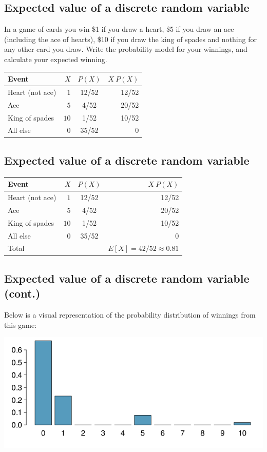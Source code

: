 \documentclass[
]{article}
\begin{document}
\hypertarget{expected-value-of-a-discrete-random-variable}{%
\subsection{Expected value of a discrete random
variable}\label{expected-value-of-a-discrete-random-variable}}

In a game of cards you win \$1 if you draw a heart, \$5 if you draw an
ace (including the ace of hearts), \$10 if you draw the king of spades
and nothing for any other card you draw. Write the probability model for
your winnings, and calculate your expected winning.

\begin{longtable}[]{@{}lrcr@{}}
\toprule
Event & \(X\) & \(P(X)\) & \(X ~ P(X)\)\tabularnewline
\midrule
\endhead
Heart (not ace) & \(1\) & 12/52 & 12/52\tabularnewline
Ace & \(5\) & 4/52 & 20/52\tabularnewline
King of spades & \(10\) & 1/52 & 10/52\tabularnewline
All else & \(0\) & 35/52 & 0\tabularnewline
\bottomrule
\end{longtable}

\hypertarget{expected-value-of-a-discrete-random-variable-1}{%
\subsection{Expected value of a discrete random
variable}\label{expected-value-of-a-discrete-random-variable-1}}

\begin{longtable}[]{@{}lrcr@{}}
\toprule
Event & \(X\) & \(P(X)\) & \(X ~ P(X)\)\tabularnewline
\midrule
\endhead
Heart (not ace) & \(1\) & 12/52 & 12/52\tabularnewline
Ace & \(5\) & 4/52 & 20/52\tabularnewline
King of spades & \(10\) & 1/52 & 10/52\tabularnewline
All else & \(0\) & 35/52 & 0\tabularnewline
Total & & & \(E[X] = 42/52 \approx 0.81\)\tabularnewline
\bottomrule
\end{longtable}

\hypertarget{expected-value-of-a-discrete-random-variable-cont.}{%
\subsection{Expected value of a discrete random variable
(cont.)}\label{expected-value-of-a-discrete-random-variable-cont.}}

Below is a visual representation of the probability distribution of
winnings from this game:

\includegraphics[width=700px]{fig/card_game}
\end{document}
